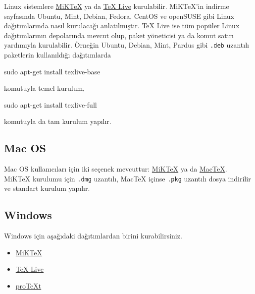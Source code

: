 \documentclass[
  letterpaper,
  DIV=11,
  numbers=noendperiod]{scrreprt}
\newenvironment{Shaded}{\begin{snugshade}}{\end{snugshade}}
\newcommand{\FunctionTok}[1]{\textcolor[rgb]{0.28,0.35,0.67}{#1}}
\newcommand{\NormalTok}[1]{\textcolor[rgb]{0.00,0.23,0.31}{#1}}
\providecommand{\tightlist}{%
  \setlength{\itemsep}{0pt}\setlength{\parskip}{0pt}}\usepackage{longtable,booktabs,array}
\begin{document}
Linux sistemlere \href{https://miktex.org/download}{MiKTeX} ya da
\href{http://www.tug.org/texlive/}{TeX Live} kurulabilir. MiKTeX'in
indirme sayfasında Ubuntu, Mint, Debian, Fedora, CentOS ve openSUSE gibi
Linux dağıtımlarında nasıl kurulacağı anlatılmıştır. TeX Live ise tüm
popüler Linux dağıtımlarının depolarında mevcut olup, paket yöneticisi
ya da komut satırı yardımıyla kurulabilir. Örneğin Ubuntu, Debian, Mint,
Pardus gibi \texttt{.deb} uzantılı paketlerin kullanıldığı dağıtımlarda

\begin{Shaded}
\begin{Highlighting}[]
\FunctionTok{sudo}\NormalTok{ apt{-}get install texlive{-}base}
\end{Highlighting}
\end{Shaded}

komutuyla temel kurulum,

\begin{Shaded}
\begin{Highlighting}[]
\FunctionTok{sudo}\NormalTok{ apt{-}get install texlive{-}full}
\end{Highlighting}
\end{Shaded}

komutuyla da tam kurulum yapılır.

\hypertarget{mac-os}{%
\subsection{Mac OS}\label{mac-os}}

Mac OS kullanıcıları için iki seçenek mevcuttur:
\href{https://miktex.org/download}{MiKTeX} ya da
\href{http://www.tug.org/mactex/}{MacTeX}. MiKTeX kurulumu için
\texttt{.dmg} uzantılı, MacTeX içinse \texttt{.pkg} uzantılı dosya
indirilir ve standart kurulum yapılır.

\hypertarget{windows}{%
\subsection{Windows}\label{windows}}

Windows için aşağıdaki dağıtımlardan birini kurabilirsiniz.

\begin{itemize}
\tightlist
\item
  \href{https://miktex.org/download}{MiKTeX}
\item
  \href{http://www.tug.org/texlive/}{TeX Live}
\item
  \href{https://tug.org/protext/}{proTeXt}
\end{itemize}
\end{document}
